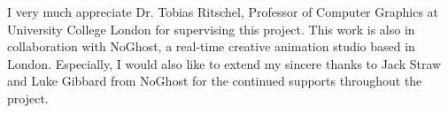\begin{acknowledgements}
I very much appreciate Dr. Tobias Ritschel, Professor of Computer Graphics at University College London for supervising this project. This work is also in collaboration with NoGhost, a real-time creative animation studio based in London. Especially, I would also like to extend my sincere thanks to Jack Straw and Luke Gibbard from NoGhost for the continued supports throughout the project.
\end{acknowledgements}



\setcounter{tocdepth}{2} 

\tableofcontents
\listoffigures
\listoftables

